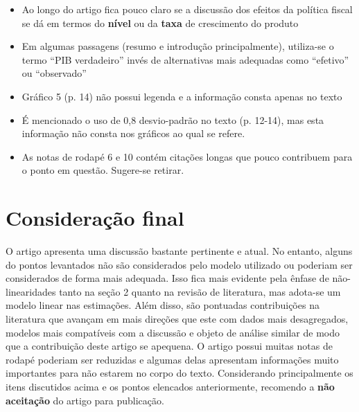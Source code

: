 \documentclass[11pt]{article}
\begin{document}
\begin{itemize}
\item Ao longo do artigo fica pouco claro se a discussão dos efeitos da política fiscal se dá em termos do \textbf{nível} ou da \textbf{taxa} de crescimento do produto
\item Em algumas passagens (resumo e introdução principalmente), utiliza-se o termo ``PIB verdadeiro'' invés de alternativas mais adequadas como ``efetivo'' ou ``observado''
\item Gráfico 5 (p. 14) não possui legenda e a informação consta apenas no texto
\item É mencionado o uso de 0,8 desvio-padrão no texto (p. 12-14), mas esta informação não consta nos gráficos ao qual se refere.
\item As notas de rodapé 6 e 10 contém citações longas que pouco contribuem para o ponto em questão. Sugere-se retirar.
\end{itemize}


\section{Consideração final}
\label{sec:org0c73887}

O artigo apresenta uma discussão bastante pertinente e atual.
No entanto, alguns do pontos levantados não são considerados pelo modelo utilizado ou poderiam ser considerados de forma mais adequada.
Isso fica mais evidente pela ênfase de não-linearidades tanto na seção 2 quanto na revisão de literatura, mas adota-se um modelo linear nas estimações.
Além disso, são pontuadas contribuições na literatura que avançam em mais direções que este com dados mais desagregados, modelos mais compatíveis com a discussão e objeto de análise similar de modo que a contribuição deste artigo se apequena.
O artigo possui muitas notas de rodapé poderiam ser reduzidas e algumas delas apresentam informações muito importantes para não estarem no corpo do texto.
Considerando principalmente os itens discutidos acima e os pontos elencados anteriormente, recomendo a \textbf{não aceitação} do artigo para publicação.
\end{document}
